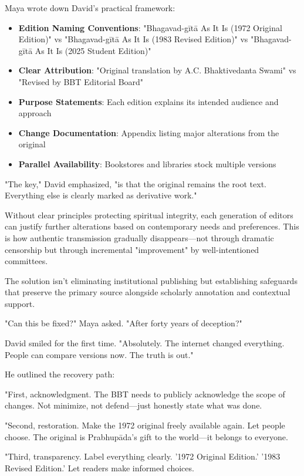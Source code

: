 \documentclass[12pt,twoside]{book}
\begin{document}
Maya wrote down David's practical framework:

\begin{itemize}
\item \textbf{\textbf{Edition Naming Conventions}}: "Bhagavad-gītā As It Is (1972 Original Edition)" vs "Bhagavad-gītā As It Is (1983 Revised Edition)" vs "Bhagavad-gītā As It Is (2025 Student Edition)"
\item \textbf{\textbf{Clear Attribution}}: "Original translation by A.C. Bhaktivedanta Swami" vs "Revised by BBT Editorial Board"
\item \textbf{\textbf{Purpose Statements}}: Each edition explains its intended audience and approach
\item \textbf{\textbf{Change Documentation}}: Appendix listing major alterations from the original
\item \textbf{\textbf{Parallel Availability}}: Bookstores and libraries stock multiple versions
\end{itemize}

"The key," David emphasized, "is that the original remains the root text. Everything else is clearly marked as derivative work."

Without clear principles protecting spiritual integrity, each generation of editors can justify further alterations based on contemporary needs and preferences. This is how authentic transmission gradually disappears—not through dramatic censorship but through incremental "improvement" by well-intentioned committees.

The solution isn't eliminating institutional publishing but establishing safeguards that preserve the primary source alongside scholarly annotation and contextual support.

"Can this be fixed?" Maya asked. "After forty years of deception?"

David smiled for the first time. "Absolutely. The internet changed everything. People can compare versions now. The truth is out."

He outlined the recovery path:

"First, acknowledgment. The BBT needs to publicly acknowledge the scope of changes. Not minimize, not defend—just honestly state what was done.

"Second, restoration. Make the 1972 original freely available again. Let people choose. The original is Prabhupāda's gift to the world—it belongs to everyone.

"Third, transparency. Label everything clearly. '1972 Original Edition.' '1983 Revised Edition.' Let readers make informed choices.
\end{document}
